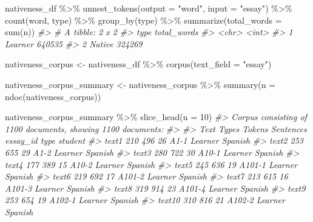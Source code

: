 \documentclass[
]{article}
\newenvironment{Shaded}{\begin{snugshade}}{\end{snugshade}}
\newcommand{\AttributeTok}[1]{\textcolor[rgb]{0.77,0.63,0.00}{#1}}
\newcommand{\CommentTok}[1]{\textcolor[rgb]{0.56,0.35,0.01}{\textit{#1}}}
\newcommand{\DecValTok}[1]{\textcolor[rgb]{0.00,0.00,0.81}{#1}}
\newcommand{\FunctionTok}[1]{\textcolor[rgb]{0.00,0.00,0.00}{#1}}
\newcommand{\NormalTok}[1]{#1}
\newcommand{\OtherTok}[1]{\textcolor[rgb]{0.56,0.35,0.01}{#1}}
\newcommand{\SpecialCharTok}[1]{\textcolor[rgb]{0.00,0.00,0.00}{#1}}
\newcommand{\StringTok}[1]{\textcolor[rgb]{0.31,0.60,0.02}{#1}}
\begin{document}
\begin{Shaded}
\begin{Highlighting}[]
\NormalTok{nativeness\_df }\SpecialCharTok{\%\textgreater{}\%}
    \FunctionTok{unnest\_tokens}\NormalTok{(}\AttributeTok{output =} \StringTok{"word"}\NormalTok{, }\AttributeTok{input =} \StringTok{"essay"}\NormalTok{) }\SpecialCharTok{\%\textgreater{}\%}
    \FunctionTok{count}\NormalTok{(word, type) }\SpecialCharTok{\%\textgreater{}\%}
    \FunctionTok{group\_by}\NormalTok{(type) }\SpecialCharTok{\%\textgreater{}\%}
    \FunctionTok{summarize}\NormalTok{(}\AttributeTok{total\_words =} \FunctionTok{sum}\NormalTok{(n))}
\CommentTok{\#\textgreater{} \# A tibble: 2 x 2}
\CommentTok{\#\textgreater{}   type    total\_words}
\CommentTok{\#\textgreater{}   \textless{}chr\textgreater{}         \textless{}int\textgreater{}}
\CommentTok{\#\textgreater{} 1 Learner      640535}
\CommentTok{\#\textgreater{} 2 Native       324269}
\end{Highlighting}
\end{Shaded}

\begin{Shaded}
\begin{Highlighting}[]
\NormalTok{nativeness\_corpus }\OtherTok{\textless{}{-}}\NormalTok{ nativeness\_df }\SpecialCharTok{\%\textgreater{}\%}
    \FunctionTok{corpus}\NormalTok{(}\AttributeTok{text\_field =} \StringTok{"essay"}\NormalTok{)}

\NormalTok{nativeness\_corpus\_summary }\OtherTok{\textless{}{-}}\NormalTok{ nativeness\_corpus }\SpecialCharTok{\%\textgreater{}\%}
    \FunctionTok{summary}\NormalTok{(}\AttributeTok{n =} \FunctionTok{ndoc}\NormalTok{(nativeness\_corpus))}

\NormalTok{nativeness\_corpus\_summary }\SpecialCharTok{\%\textgreater{}\%}
    \FunctionTok{slice\_head}\NormalTok{(}\AttributeTok{n =} \DecValTok{10}\NormalTok{)}
\CommentTok{\#\textgreater{} Corpus consisting of 1100 documents, showing 1100 documents:}
\CommentTok{\#\textgreater{} }
\CommentTok{\#\textgreater{}    Text Types Tokens Sentences essay\_id    type student}
\CommentTok{\#\textgreater{}   text1   210    496        26     A1{-}1 Learner Spanish}
\CommentTok{\#\textgreater{}   text2   253    655        29     A1{-}2 Learner Spanish}
\CommentTok{\#\textgreater{}   text3   280    722        30    A10{-}1 Learner Spanish}
\CommentTok{\#\textgreater{}   text4   177    389        15    A10{-}2 Learner Spanish}
\CommentTok{\#\textgreater{}   text5   245    636        19   A101{-}1 Learner Spanish}
\CommentTok{\#\textgreater{}   text6   219    692        17   A101{-}2 Learner Spanish}
\CommentTok{\#\textgreater{}   text7   213    615        16   A101{-}3 Learner Spanish}
\CommentTok{\#\textgreater{}   text8   319    914        23   A101{-}4 Learner Spanish}
\CommentTok{\#\textgreater{}   text9   253    654        19   A102{-}1 Learner Spanish}
\CommentTok{\#\textgreater{}  text10   310    816        21   A102{-}2 Learner Spanish}
\end{Highlighting}
\end{Shaded}
\end{document}
